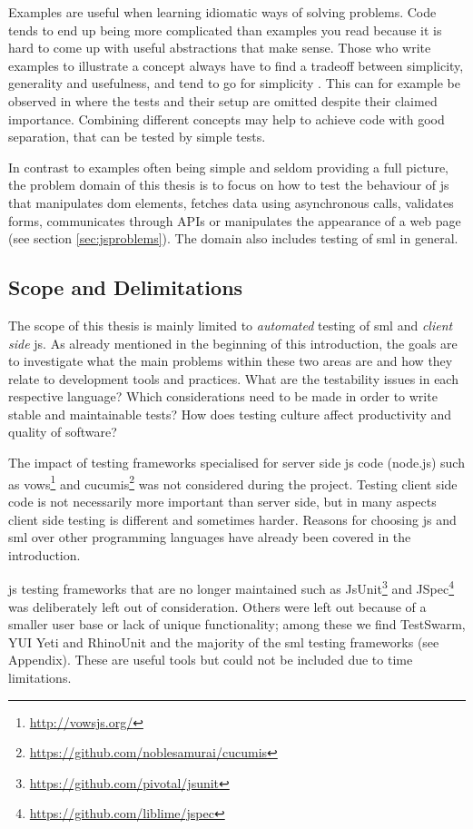 \documentclass[11pt]{article}
\begin{document}
Examples are useful when learning idiomatic ways of solving problems. Code tends to end up being more complicated than examples you read because it is hard to come up with useful abstractions that make sense. Those who write examples to illustrate a concept always have to find a tradeoff between simplicity, generality and usefulness, and tend to go for simplicity \cite[questions~56-57]{Edelstam}. This can for example be observed in \cite[p.~13-45]{Refactoring} where the tests and their setup are omitted despite their claimed importance. Combining different concepts may help to achieve code with good separation, that can be tested by simple tests.

In contrast to examples often being simple and seldom providing a full picture, the problem domain of this thesis is to focus on how to test the behaviour of \gls{js} that manipulates \gls{dom} elements, fetches data using asynchronous calls, validates forms, communicates through APIs or manipulates the appearance of a web page (see section \ref{sec:jsproblems}). The domain also includes testing of \gls{sml} in general.

\subsection{Scope and Delimitations}

The scope of this thesis is mainly limited to \emph{automated} testing of \gls{sml} and \emph{client side} \gls{js}. As already mentioned in the beginning of this introduction, the goals are to investigate what the main problems within these two areas are and how they relate to development tools and practices. What are the testability issues in each respective language? Which considerations need to be made in order to write stable and maintainable tests? How does testing culture affect productivity and quality of software?

The impact of testing frameworks specialised for server side \gls{js} code (node.js) such as vows\footnote{\url{http://vowsjs.org/}} and cucumis\footnote{\url{https://github.com/noblesamurai/cucumis}} was not considered during the project. Testing client side code is not necessarily more important than server side, but in many aspects client side testing is different and sometimes harder. Reasons for choosing \gls{js} and \gls{sml} over other programming languages have already been covered in the introduction.

\gls{js} testing frameworks that are no longer maintained such as JsUnit\footnote{\url{https://github.com/pivotal/jsunit}} and JSpec\footnote{\url{https://github.com/liblime/jspec}} was deliberately left out of consideration. Others were left out because of a smaller user base or lack of unique functionality; among these we find TestSwarm, YUI Yeti and RhinoUnit and the majority of the \gls{sml} testing frameworks (see Appendix). These are useful tools but could not be included due to time limitations.
\end{document}
